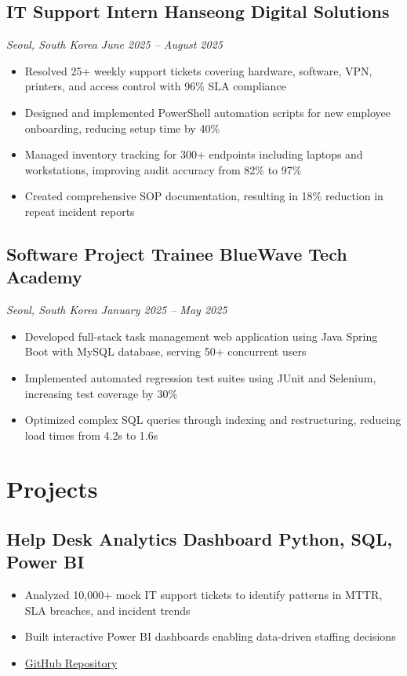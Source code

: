 \documentclass[a4paper,10pt]{article}
\begin{document}
\subsection*{IT Support Intern \hfill Hanseong Digital Solutions}
\textit{Seoul, South Korea \hfill June 2025 -- August 2025}
\begin{itemize}
    \item Resolved 25+ weekly support tickets covering hardware, software, VPN, printers, and access control with 96\% SLA compliance
    \item Designed and implemented PowerShell automation scripts for new employee onboarding, reducing setup time by 40\%
    \item Managed inventory tracking for 300+ endpoints including laptops and workstations, improving audit accuracy from 82\% to 97\%
    \item Created comprehensive SOP documentation, resulting in 18\% reduction in repeat incident reports
\end{itemize}

\subsection*{Software Project Trainee \hfill BlueWave Tech Academy}
\textit{Seoul, South Korea \hfill January 2025 -- May 2025}
\begin{itemize}
    \item Developed full-stack task management web application using Java Spring Boot with MySQL database, serving 50+ concurrent users
    \item Implemented automated regression test suites using JUnit and Selenium, increasing test coverage by 30\%
    \item Optimized complex SQL queries through indexing and restructuring, reducing load times from 4.2s to 1.6s
\end{itemize}

\section*{Projects}

\subsection*{Help Desk Analytics Dashboard \hfill Python, SQL, Power BI}
\begin{itemize}
    \item Analyzed 10,000+ mock IT support tickets to identify patterns in MTTR, SLA breaches, and incident trends
    \item Built interactive Power BI dashboards enabling data-driven staffing decisions
    \item \href{https://github.com/minjunkim/helpdesk-analytics}{GitHub Repository}
\end{itemize}
\end{document}

